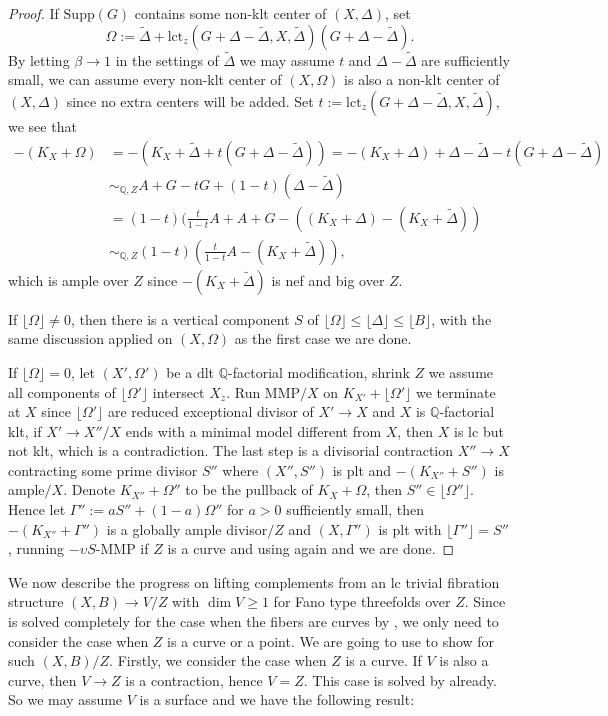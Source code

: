 \documentclass[letterpaper,reqno,12pt]{amsart}
\numberwithin{equation}{section}
\theoremstyle{plain}
\begin{document}
\begin{proof}
    If $\text{Supp}(G)$ contains some non-klt center of $(X,\Delta)$, set \[\Omega:=\tilde\Delta+\text{lct}_z(G+\Delta-\tilde\Delta,X,\tilde\Delta) (G+\Delta-\tilde\Delta).\] By letting $\beta\to 1$ in the settings of $\tilde\Delta$ we may assume $t$ and $\Delta-\tilde\Delta$ are sufficiently small, we can assume every non-klt center of $(X,\Omega)$ is also a non-klt center of $(X,\Delta)$ since no extra centers will be added. Set $t:=\text{lct}_z(G+\Delta-\tilde\Delta,X,\tilde\Delta)$, we see that \[\begin{aligned}-(K_X+\Omega)&=-(K_X+\tilde\Delta+t(G+\Delta-\tilde\Delta))=-(K_X+\Delta)+\Delta-\tilde\Delta-t(G+\Delta-\tilde\Delta)\\&\sim_{{\mathbb Q},Z}A+G-tG+(1-t)(\Delta-\tilde\Delta)\\&=(1-t)(\frac{t}{1-t}A+A+G-((K_X+\Delta)-(K_X+\tilde\Delta))\\&\sim_{{\mathbb Q},Z}(1-t)(\frac{t}{1-t}A-(K_X+\tilde\Delta)),\end{aligned}\] which is ample over $Z$ since $-(K_X+\tilde\Delta)$ is nef and big over $Z$. 
    
    If $\lfloor \Omega\rfloor\neq 0$, then there is a vertical component $S$ of $\lfloor \Omega\rfloor\leq\lfloor\Delta\rfloor\leq\lfloor B\rfloor$, with the same discussion applied on $(X,\Omega)$ as the first case we are done. 
    
    If $\lfloor \Omega\rfloor=0$, let $(X',\Omega')$ be a dlt ${\mathbb Q}$-factorial modification, shrink $Z$ we assume all components of $\lfloor \Omega'\rfloor$ intersect $X_z$. Run MMP$/X$ on $K_{X'}+\lfloor\Omega'\rfloor$ we terminate at $X$ since $\lfloor \Omega'\rfloor$ are reduced exceptional divisor of $X'\to X$ and $X$ is ${\mathbb Q}$-factorial klt, if $X'\to X''/X$ ends with a minimal model different from $X$, then $X$ is lc but not klt, which is a contradiction. The last step is a divisorial contraction $X''\to X$ contracting some prime divisor $S''$ where $(X'',S'')$ is plt and $-(K_{X''}+S'')$ is ample$/X$. Denote $K_{X''}+\Omega''$ to be the pullback of $K_X+\Omega$, then $S''\in\lfloor\Omega''\rfloor$. Hence let $\Gamma'':=aS''+(1-a)\Omega''$ for $a>0$ sufficiently small, then $-(K_{X''}+\Gamma'')$ is a globally ample divisor$/Z$ and $(X,\Gamma'')$ is plt with $\lfloor \Gamma''\rfloor=S''$, running $-\upsilon S$-MMP if $Z$ is a curve and using  again and we are done.
\end{proof}

We now describe the progress on lifting complements from an lc trivial fibration structure $(X,B)\to V/Z$ with $\dim V\geq 1$ for Fano type threefolds over $Z$. Since  is solved completely for the case when the fibers are curves by , we only need to consider the case when $Z$ is a curve or a point. We are going to use  to show  for such $(X,B)/Z$. Firstly, we consider the case when $Z$ is a curve. If $V$ is also a curve, then $V\to Z$ is a contraction, hence $V=Z$. This case is solved by  already. So we may assume $V$ is a surface and we have the following result:
\end{document}
